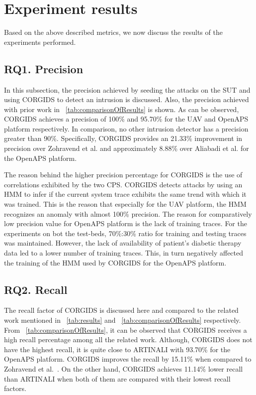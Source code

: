 \section{Experiment results} 
Based on the above described metrics, we now discuss the results of the experiments performed.

\subsection{RQ1. Precision}
In this subsection, the precision achieved by seeding the attacks on the \ac{SUT} and using \ac{CORGIDS} to detect an intrusion is discussed. Also,  the precision achieved with prior work in  ~\autoref{tab:comparisonOfResults} is shown. As can be observed, \ac{CORGIDS} achieves a precision of 100\% and 95.70\% for the \ac{UAV} and \ac{OpenAPS} platform respectively. In comparison, no other intrusion detector has a precision greater than 90\%. Specifically, \ac{CORGIDS} provides an 21.33\% improvement in precision over Zohravend et al. \cite{zohrevand2016hidden} and approximately 8.88\% over Aliabadi et al. \cite{aliabadi2017artinali} for the \ac{OpenAPS} platform.

The reason behind the higher precision percentage for \ac{CORGIDS} is the use of correlations exhibited by the two CPS. \ac{CORGIDS} detects attacks by using an \ac{HMM} to infer if the current system trace exhibits the same trend with which it was trained. This is the reason that especially for the \ac{UAV} platform, the \ac{HMM} recognizes an anomaly with almost 100\% precision. The reason for comparatively low precision value for \ac{OpenAPS} platform is the lack of training traces. For the experiments on bot the test-beds, 70\%:30\% ratio for training and testing traces was maintained. However, the lack of availability of patient's diabetic therapy data led to a lower number of training traces. This, in turn negatively affected the training of the \ac{HMM} used by \ac{CORGIDS} for the \ac{OpenAPS} platform.

\subsection{RQ2. Recall}
The recall factor of \ac{CORGIDS} is discussed here and compared to the related work mentioned in ~\autoref{tab:results} and ~\autoref{tab:comparisonOfResults} respectively. From  ~\autoref{tab:comparisonOfResults}, it can be observed that \ac{CORGIDS} receives a high recall percentage among all the related work. Although, \ac{CORGIDS} does not have the highest recall, it is quite close to ARTINALI with 93.70\% for the \ac{OpenAPS} platform. \ac{CORGIDS} improves the recall by 15.11\% when compared to  Zohravend et al.~\cite{zohrevand2016hidden}. On the other hand, \ac{CORGIDS} achieves 11.14\% lower recall than ARTINALI when both of them are compared with their lowest recall factors. 

